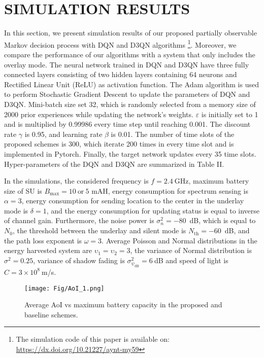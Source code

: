 \documentclass[journal]{IEEEtran}
\begin{document}
	\section{SIMULATION RESULTS} 
		In this section, we present simulation results of our proposed partially observable Markov decision process with DQN and D3QN algorithms \footnote{The simulation code of this paper is available on: \url{https://dx.doi.org/10.21227/aynt-my59}}. Moreover, we compare the performance of our algorithms with a system that only includes the overlay mode. The neural network trained in DQN and D3QN have three fully connected layers consisting of two hidden layers containing 64 neurons and Rectified Linear Unit (ReLU) as activation function. The Adam algorithm \cite{adam_31} is used to perform Stochastic Gradient Descent to update the parameters of DQN and D3QN. Mini-batch size set 32, which is randomly selected from a memory size of 2000 prior experiences while updating the network's weights. $\varepsilon$ is initially set to 1 and is multiplied by 0.99986 every time step until reaching 0.001. The discount rate $\gamma$ is 0.95, and learning rate $\beta$ is 0.01. The number of time slots of the proposed schemes is 300, which iterate 200 times in every time slot and is implemented in Pytorch. Finally, the target network updates every 35 time slots. Hyper-parameters of the DQN and D3QN are summarized in Table II.

		In the simulations, the considered frequency is \hspace{2cm} $f=2.4~$GHz, maximum battery size of SU is $B_{\text{max}}=10~\text{or}~5$ mAH, energy consumption for spectrum sensing is $\alpha=3$, energy consumption for sending location to the center in the underlay mode is $\delta=1$, and the energy consumption for updating status is equal to inverse of channel gain. Furthermore, the noise power is $\sigma _n^2= -80$~dB, which is equal to $N_0$, the threshold between the underlay and silent mode is $N_\text{th}=-60$~dB, and the path loss exponent is $\omega=3$. Average Poisson and Normal distributions in the energy harvested system are ${\upsilon _1} = {\upsilon _2}=3$, the variance of Normal distribution is ${\sigma ^2}=0.25$, variance of shadow fading is $\sigma _{{\psi _{\text{dB}}}}^2 = 6~$dB and speed of light is $C=3 \times {10^8}~$m/s.

		\begin{figure}[!t]
			\centering
			\texttt{[image: Fig/AoI\_1.png]}
			\caption{Average AoI vs maximum battery capacity in the proposed and baseline schemes.}
			\label{AoI1}
		\end{figure}
\end{document}
